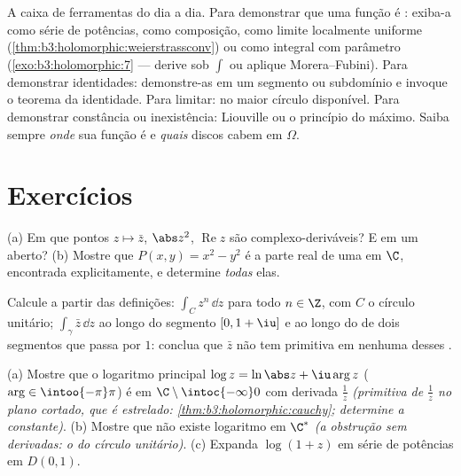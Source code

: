 \begin{method}\label{met:b3:holomorphic:toolkit}
A caixa de ferramentas do dia a dia. Para demonstrar que uma função é
: exiba-a como série de potências, como composição, como
limite localmente uniforme (\cref{thm:b3:holomorphic:weierstrassconv}) ou como integral com
parâmetro  (\cref{exo:b3:holomorphic:7} --- derive sob $\int$ ou aplique
Morera--Fubini). Para demonstrar identidades: demonstre-as em um
segmento ou subdomínio e invoque o teorema da identidade. Para limitar:
 no maior círculo disponível. Para demonstrar
constância ou inexistência: Liouville ou o princípio do máximo. Saiba
sempre \emph{onde} sua função é  e \emph{quais} discos cabem em
$\Omega$.
\end{method}

\section{Exercícios}

\begin{exercise}[$\star$]\label{exo:b3:holomorphic:1}
(a) Em que pontos $z \mapsto \bar z$, $\abs z^2$, $\operatorname{Re}z$ são complexo-deriváveis? E
 em um aberto?
(b) Mostre que $P(x, y) = x^2 - y^2$ é a parte real de uma  em $\C$,
encontrada explicitamente, e determine \emph{todas} elas.
\end{exercise}

\begin{exercise}[$\star$]\label{exo:b3:holomorphic:2}
Calcule a partir das definições: $\int_{C}z^n\,\dd z$ para todo $n
\in \Z$, com $C$ o
círculo unitário; $\int_\gamma\bar z\,\dd z$ ao longo do segmento $[0, 1+\iu]$ e ao longo do 
de dois segmentos que passa por $1$: conclua que $\bar z$ não
tem primitiva em nenhuma  desses .
\end{exercise}

\begin{exercise}[$\star\star$]\label{exo:b3:holomorphic:3}
(a) Mostre que o logaritmo principal $\log z = \ln\abs z +
\iu\arg z$ ($\arg \in \intoo{-\pi}\pi$) é  em $\C\setminus\intoc{-\infty}0$
com derivada $\frac1z$ \emph{(primitiva de $\frac1z$ no plano cortado, que é
estrelado: \cref{thm:b3:holomorphic:cauchy}; determine a constante)}.
(b) Mostre que não existe logaritmo  em $\C^*$ \emph{(a
obstrução sem derivadas: o  do círculo unitário)}.
(c) Expanda $\log(1 + z)$ em série de potências em $D(0,1)$.
\end{exercise}

